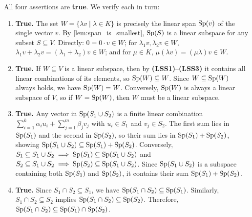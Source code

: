 \begin{exercisesolution*}
\label{sol:span_subspaces_mc}
All four assertions are \textbf{true}. We verify each in turn:

\begin{enumerate}[label=\textbf{(\arabic*)}]
    \item \textbf{True.} The set $W = \{\lambda v \mid \lambda \in K\}$ is precisely the linear span $\operatorname{Sp}(v)$ of the single vector $v$. By \cref{lem:span_is_smallest}, $\operatorname{Sp}(S)$ is a linear subspace for any subset $S \subseteq V$. Directly: $0 = 0 \cdot v \in W$; for $\lambda_1 v, \lambda_2 v \in W$, $\lambda_1 v + \lambda_2 v = (\lambda_1 + \lambda_2) v \in W$; and for $\mu \in K$, $\mu (\lambda v) = (\mu \lambda) v \in W$.

    \item \textbf{True.} If $W \subseteq V$ is a linear subspace, then by \textbf{(LSS1)}--\textbf{(LSS3)} it contains all linear combinations of its elements, so $\operatorname{Sp}(W) \subseteq W$. Since $W \subseteq \operatorname{Sp}(W)$ always holds, we have $\operatorname{Sp}(W) = W$. Conversely, $\operatorname{Sp}(W)$ is always a linear subspace of $V$, so if $W = \operatorname{Sp}(W)$, then $W$ must be a linear subspace.

    \item \textbf{True.} Any vector in $\operatorname{Sp}(S_1 \cup S_2)$ is a finite linear combination $\sum_{i=1}^k \alpha_i u_i + \sum_{j=1}^m \beta_j v_j$ with $u_i \in S_1$ and $v_j \in S_2$. The first sum lies in $\operatorname{Sp}(S_1)$ and the second in $\operatorname{Sp}(S_2)$, so their sum lies in $\operatorname{Sp}(S_1) + \operatorname{Sp}(S_2)$, showing $\operatorname{Sp}(S_1 \cup S_2) \subseteq \operatorname{Sp}(S_1) + \operatorname{Sp}(S_2)$. Conversely, $S_1 \subseteq S_1 \cup S_2 \implies \operatorname{Sp}(S_1) \subseteq \operatorname{Sp}(S_1 \cup S_2)$ and $S_2 \subseteq S_1 \cup S_2 \implies \operatorname{Sp}(S_2) \subseteq \operatorname{Sp}(S_1 \cup S_2)$. Since $\operatorname{Sp}(S_1 \cup S_2)$ is a subspace containing both $\operatorname{Sp}(S_1)$ and $\operatorname{Sp}(S_2)$, it contains their sum $\operatorname{Sp}(S_1) + \operatorname{Sp}(S_2)$.

    \item \textbf{True.} Since $S_1 \cap S_2 \subseteq S_1$, we have $\operatorname{Sp}(S_1 \cap S_2) \subseteq \operatorname{Sp}(S_1)$. Similarly, $S_1 \cap S_2 \subseteq S_2$ implies $\operatorname{Sp}(S_1 \cap S_2) \subseteq \operatorname{Sp}(S_2)$. Therefore, $\operatorname{Sp}(S_1 \cap S_2) \subseteq \operatorname{Sp}(S_1) \cap \operatorname{Sp}(S_2)$.
\end{enumerate}
\end{exercisesolution*}

